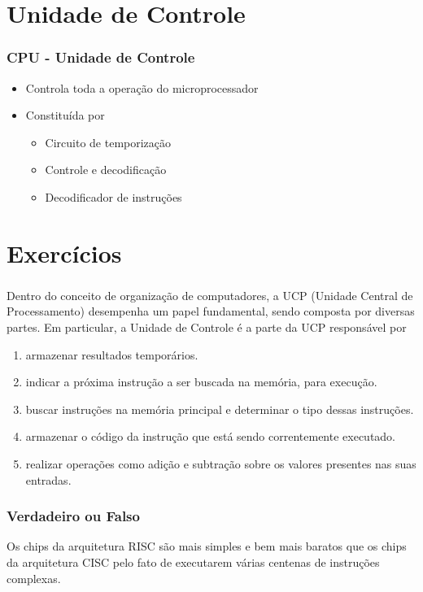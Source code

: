 \documentclass[aspectratio=169,
				xcolor=table]{beamer}
\begin{document}
	\section{Unidade de Controle}		
		\begin{frame}
			\frametitle{CPU - Unidade de Controle}
			\begin{itemize}
				\item Controla toda a operação do microprocessador
				\vspace{1em}
				\item Constituída por
				\begin{itemize}
					\item Circuito de temporização
					\item Controle e decodificação
					\item Decodificador de instruções
				\end{itemize}
			\end{itemize}
		\end{frame}
	
	\section{Exercícios}	

	\begin{frame}
		\frametitle{}
		Dentro do conceito de organização de computadores, a UCP (Unidade Central de Processamento) desempenha um papel fundamental, sendo composta por diversas partes. Em particular, a Unidade de Controle é a parte da UCP responsável por
		\vspace{1em}
		\begin{enumerate}[a]
			\normalsize
			\item armazenar resultados temporários.
			\item indicar a próxima instrução a ser buscada na memória, para execução.
			\item buscar instruções na memória principal e determinar o tipo dessas instruções.
			\item armazenar o código da instrução que está sendo correntemente executado.
			\item realizar operações como adição e subtração sobre os valores presentes nas suas entradas.		
		\end{enumerate}

	\end{frame}
	
	\begin{frame}
		\frametitle{Verdadeiro ou Falso}
		Os chips da arquitetura RISC são mais simples e bem mais baratos que os chips da arquitetura CISC pelo fato de executarem várias centenas de instruções complexas. 
	\end{frame}
	
\end{document}
